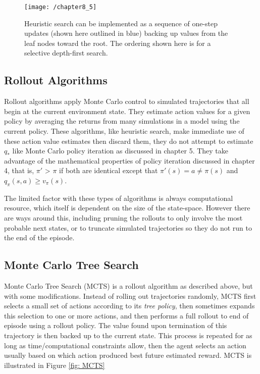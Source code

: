 \begin{figure}
	\centering
	\texttt{[image: /chapter8\_5]}
	\caption{Heuristic search can be implemented as a sequence of one-step updates (shown here outlined in blue) backing up values from the leaf nodes toward the root. The ordering shown here is for a selective depth-first search.}
	\label{fig: heuristic search}
\end{figure}

\subsection{Rollout Algorithms}
Rollout algorithms apply Monte Carlo control to simulated trajectories that all begin at the current environment state. They estimate action values for a given policy by averaging the returns from many simulations in a model using the current policy. These algorithms, like heuristic search, make immediate use of these action value estimates then discard them, they do not attempt to estimate $q_*$ like Monte Carlo policy iteration as discussed in chapter 5. They take advantage of the mathematical properties of policy iteration discussed in chapter 4, that is, $\pi'$ > $\pi$ if both are identical except that $\pi'(s) = a \neq \pi(s)$ and $q_{\pi}(s,a) \geq v_\pi(s)$.

The limited factor with these types of algorithms is always computational resource, which itself is dependent on the size of the state-space. However there are ways around this, including pruning the rollouts to only involve the most probable next states, or to truncate simulated trajectories so they do not run to the end of the episode.

\subsection{Monte Carlo Tree Search}
Monte Carlo Tree Search (MCTS) is a rollout algorithm as described above, but with some modifications. Instead of rolling out trajectories randomly, MCTS first selects a small set of actions according to its \textit{tree policy}, then sometimes expands this selection to one or more actions, and then performs a full rollout to end of episode using a rollout policy. The value found upon termination of this trajectory is then backed up to the current state. This process is repeated for as long as time/computational constraints allow, then the agent selects an action usually based on which action produced best future estimated reward. MCTS is illustrated in Figure \ref{fig: MCTS}

